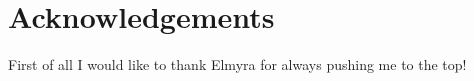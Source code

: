 \documentclass[../bachelor_paper.tex]{subfiles}
\begin{document}
\section*{Acknowledgements}
    \label{chap:acknowledgements}
    \thispagestyle{empty}
    
    First of all I would like to thank Elmyra for always pushing me to the top!
\end{document}
